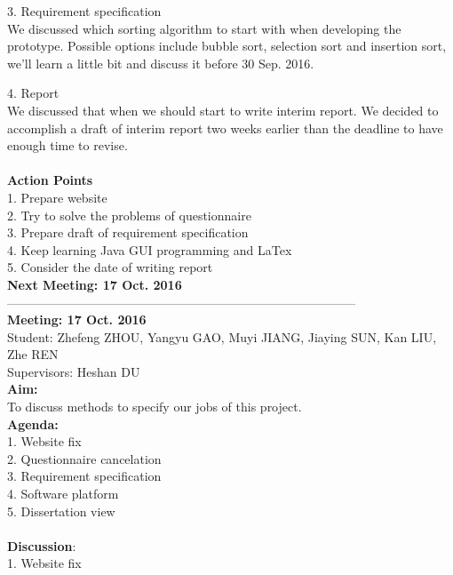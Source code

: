 \documentclass[paper=a4, fontsize=11pt,twoside]{scrartcl}		%
\begin{document}
   
3.	Requirement specification\\

We discussed which sorting algorithm to start with when developing the prototype.  Possible options include bubble sort, selection sort and insertion sort, we’ll learn a little bit and discuss it before 30 Sep. 2016.

4.	Report\\

We discussed that when we should start to write interim report. We decided to 	accomplish a draft of interim report two weeks earlier than the deadline to have enough time to revise.\\\\

\textbf{Action Points}\\
1.	Prepare website\\
2.	Try to solve the problems of questionnaire\\
3.	Prepare draft of requirement specification\\
4.	Keep learning Java GUI programming and LaTex\\
5.	Consider the date of writing report\\
	 
\textbf{Next Meeting: 17 Oct. 2016}\\
------------------------------------------------------------------------------------\\
\textbf{Meeting: 17 Oct. 2016}\\


Student: Zhefeng ZHOU, Yangyu GAO, Muyi JIANG, Jiaying SUN, Kan LIU, Zhe REN\\
Supervisors: Heshan DU\\

\textbf{Aim:} \\
To discuss methods to specify our jobs of this project.\\

\textbf{Agenda:} \\
1.	Website fix\\
2.	Questionnaire cancelation\\
3.	Requirement specification\\
4.	Software platform\\
5.	Dissertation view\\\\

\textbf{Discussion}:\\
1.	Website fix\\
\end{document}
